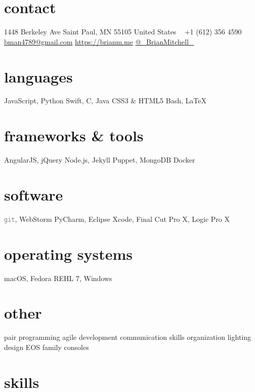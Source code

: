 \documentclass[]{cv-style} %
\begin{document}
\lastupdated


\begin{aside} %
\section{contact}
1448 Berkeley Ave
Saint Paul, MN 55105
United States
~
+1 (612) 356 4590
~
\href{mailto:bman4789@gmail.com}{bman4789@gmail.com}
\href{https://brianm.me}{https://brianm.me}
\href{https://twitter.com/_BrianMitchell_}{\textcolor{twitter}{ }@\_BrianMitchell\_}
\section{languages}
JavaScript, Python
Swift, C, Java
CSS3 \& HTML5
Bash, \LaTeX
\section{frameworks \& tools}
AngularJS, jQuery
Node.js, Jekyll
Puppet, MongoDB
Docker
\section{software}
\textcolor{gray}{\texttt{git}}, WebStorm
PyCharm, Eclipse
Xcode, Final Cut Pro X,
Logic Pro X
\section{operating systems}
macOS, Fedora
REHL 7, Windows
\section{other}
pair programming
agile development
communication skills
organization
lighting design
EOS family consoles
\end{aside}


\section{skills}
  \vspace{-0.2cm}
\end{document}

